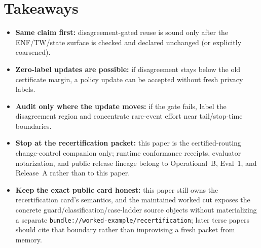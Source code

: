 \documentclass[11pt]{article}
\begin{document}
\section{Takeaways}
\begin{itemize}[leftmargin=*]
\item \textbf{Same claim first:} disagreement-gated reuse is sound only after the ENF/TW/state surface is checked and declared unchanged (or explicitly coarsened).
\item \textbf{Zero-label updates are possible:} if disagreement stays below the old certificate margin, a policy update can be accepted without fresh privacy labels.
\item \textbf{Audit only where the update moves:} if the gate fails, label the disagreement region and concentrate rare-event effort near tail/stop-time boundaries.
\item \textbf{Stop at the recertification packet:} this paper is the certified-routing change-control companion only; runtime conformance receipts, evaluator notarization, and public release lineage belong to Operational~B, Eval~1, and Release~A rather than to this paper.
\item \textbf{Keep the exact public card honest:} this paper still owns the recertification card's semantics, and the maintained worked cut exposes the concrete guard/classification/case-ladder source objects without materializing a separate \nolinkurl{bundle://worked-example/recertification}; later terse papers should cite that boundary rather than improvising a fresh packet from memory.
\end{itemize}
\end{document}
